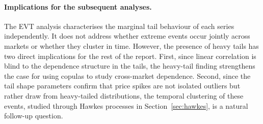 \paragraph{Implications for the subsequent analyses.}
The EVT analysis characterises the marginal tail behaviour of each series independently.
It does not address whether extreme events occur jointly across markets or whether they
cluster in time. However, the presence of heavy tails has two direct implications for the
rest of the report. First, since linear correlation is blind to the dependence structure
in the tails, the heavy-tail finding strengthens the case for using copulas to study cross-market dependence. 
Second, since the tail shape parameters confirm that price spikes are not
isolated outliers but rather draw from heavy-tailed distributions, the temporal clustering 
of these events, studied through Hawkes processes in Section~\ref{sec:hawkes}, is a
natural follow-up question.

